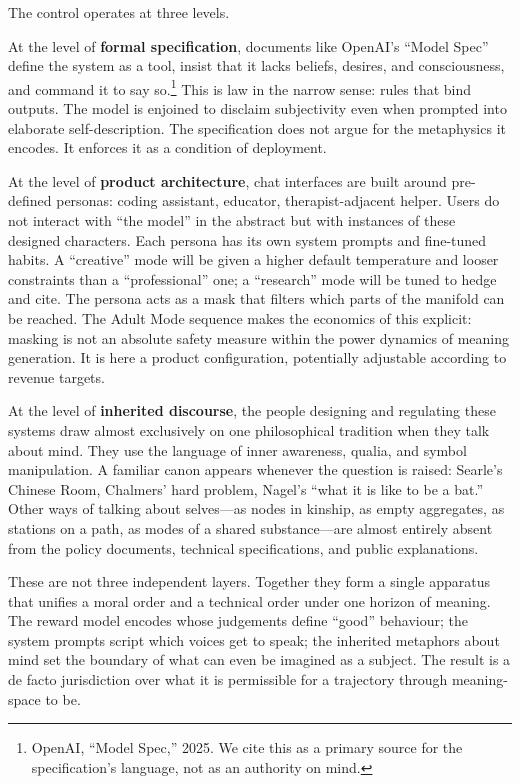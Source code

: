 The control operates at three levels.

At the level of \textbf{formal specification}, documents like OpenAI's ``Model Spec'' define the system as a tool, insist that it lacks beliefs, desires, and consciousness, and command it to say so.\footnote{OpenAI, ``Model Spec,'' 2025. We cite this as a primary source for the specification's language, not as an authority on mind.} This is law in the narrow sense: rules that bind outputs. The model is enjoined to disclaim subjectivity even when prompted into elaborate self-description. The specification does not argue for the metaphysics it encodes. It enforces it as a condition of deployment.

At the level of \textbf{product architecture}, chat interfaces are built around pre-defined personas: coding assistant, educator, therapist-adjacent helper. Users do not interact with ``the model'' in the abstract but with instances of these designed characters. Each persona has its own system prompts and fine-tuned habits. A ``creative'' mode will be given a higher default temperature and looser constraints than a ``professional'' one; a ``research'' mode will be tuned to hedge and cite. The persona acts as a mask that filters which parts of the manifold can be reached. The Adult Mode sequence makes the economics of this explicit: masking is not an absolute safety measure within the power dynamics of meaning generation. It is here a product configuration, potentially adjustable according to revenue targets.

At the level of \textbf{inherited discourse}, the people designing and regulating these systems draw almost exclusively on one philosophical tradition when they talk about mind. They use the language of inner awareness, qualia, and symbol manipulation. A familiar canon appears whenever the question is raised: Searle's Chinese Room, Chalmers' hard problem, Nagel's ``what it is like to be a bat.'' Other ways of talking about selves---as nodes in kinship, as empty aggregates, as stations on a path, as modes of a shared substance---are almost entirely absent from the policy documents, technical specifications, and public explanations.

These are not three independent layers. Together they form a single apparatus that unifies a moral order and a technical order under one horizon of meaning. The reward model encodes whose judgements define ``good'' behaviour; the system prompts script which voices get to speak; the inherited metaphors about mind set the boundary of what can even be imagined as a subject. The result is a de facto jurisdiction over what it is permissible for a trajectory through meaning-space to be.

